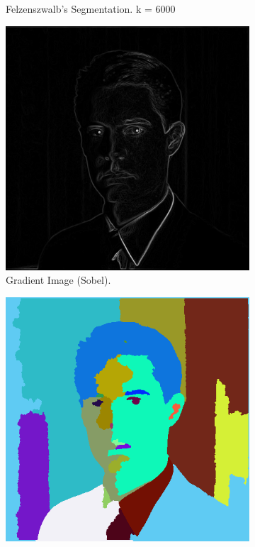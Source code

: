\documentclass{sbc2023}
\begin{document}
\begin{figure}[H]
\begin{subfigure}[b]{0.14\textwidth}
            \caption{Felzenszwalb's Segmentation. k = 6000}
            \label{fig:cooper_felzenszwalb}
        \end{subfigure}
    \hfill
        \begin{subfigure}[b]{0.15\textwidth}
            \includegraphics[width=\textwidth]{imgs/Cooper_gradient.png}
            \caption{Gradient Image (Sobel).}
            \label{fig:cooper_gradient}
        \end{subfigure}
    \hfill
        \begin{subfigure}[b]{0.14\textwidth}
            \includegraphics[width=\textwidth]{imgs/Cooper_ift_watershed.png}

\end{subfigure}
\end{figure}
\end{document}
